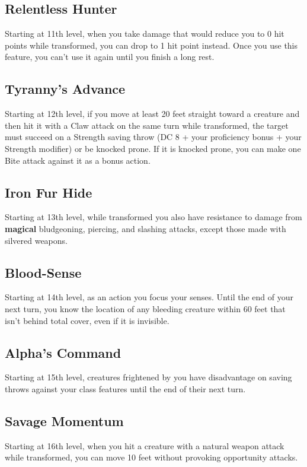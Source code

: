 \subsection*{Relentless Hunter}
Starting at 11th level, when you take damage that would reduce you to 0 hit points while transformed, you can drop to 1 hit point instead. Once you use this feature, you can't use it again until you finish a long rest.

\subsection*{Tyranny's Advance}
Starting at 12th level, if you move at least 20 feet straight toward a creature and then hit it with a Claw attack on the same turn while transformed, the target must succeed on a Strength saving throw (DC 8 + your proficiency bonus + your Strength modifier) or be knocked prone. If it is knocked prone, you can make one Bite attack against it as a bonus action.

\subsection*{Iron Fur Hide}
Starting at 13th level, while transformed you also have resistance to damage from \textbf{magical} bludgeoning, piercing, and slashing attacks, except those made with silvered weapons.

\subsection*{Blood-Sense}
Starting at 14th level, as an action you focus your senses. Until the end of your next turn, you know the location of any bleeding creature within 60 feet that isn't behind total cover, even if it is invisible.

\subsection*{Alpha's Command}
Starting at 15th level, creatures frightened by you have disadvantage on saving throws against your class features until the end of their next turn.

\subsection*{Savage Momentum}
Starting at 16th level, when you hit a creature with a natural weapon attack while transformed, you can move 10 feet without provoking opportunity attacks.

